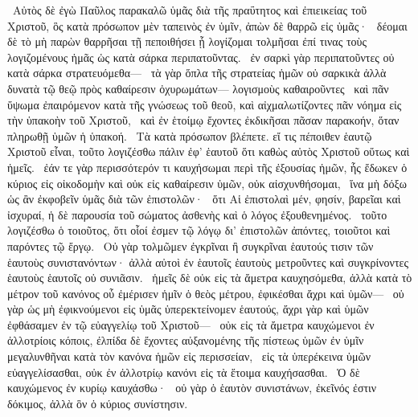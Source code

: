 ~Αὐτὸς δὲ ἐγὼ Παῦλος παρακαλῶ ὑμᾶς διὰ τῆς πραΰτητος καὶ ἐπιεικείας τοῦ Χριστοῦ, ὃς κατὰ πρόσωπον μὲν ταπεινὸς ἐν ὑμῖν, ἀπὼν δὲ θαρρῶ εἰς ὑμᾶς·
~δέομαι δὲ τὸ μὴ παρὼν θαρρῆσαι τῇ πεποιθήσει ᾗ λογίζομαι τολμῆσαι ἐπί τινας τοὺς λογιζομένους ἡμᾶς ὡς κατὰ σάρκα περιπατοῦντας.
~ἐν σαρκὶ γὰρ περιπατοῦντες οὐ κατὰ σάρκα στρατευόμεθα—
~τὰ γὰρ ὅπλα τῆς στρατείας ἡμῶν οὐ σαρκικὰ ἀλλὰ δυνατὰ τῷ θεῷ πρὸς καθαίρεσιν ὀχυρωμάτων— λογισμοὺς καθαιροῦντες
~καὶ πᾶν ὕψωμα ἐπαιρόμενον κατὰ τῆς γνώσεως τοῦ θεοῦ, καὶ αἰχμαλωτίζοντες πᾶν νόημα εἰς τὴν ὑπακοὴν τοῦ Χριστοῦ,
~καὶ ἐν ἑτοίμῳ ἔχοντες ἐκδικῆσαι πᾶσαν παρακοήν, ὅταν πληρωθῇ ὑμῶν ἡ ὑπακοή.
~Τὰ κατὰ πρόσωπον βλέπετε. εἴ τις πέποιθεν ἑαυτῷ Χριστοῦ εἶναι, τοῦτο λογιζέσθω πάλιν ἐφ’ ἑαυτοῦ ὅτι καθὼς αὐτὸς Χριστοῦ οὕτως καὶ ἡμεῖς.
~ἐάν τε γὰρ περισσότερόν τι καυχήσωμαι περὶ τῆς ἐξουσίας ἡμῶν, ἧς ἔδωκεν ὁ κύριος εἰς οἰκοδομὴν καὶ οὐκ εἰς καθαίρεσιν ὑμῶν, οὐκ αἰσχυνθήσομαι,
~ἵνα μὴ δόξω ὡς ἂν ἐκφοβεῖν ὑμᾶς διὰ τῶν ἐπιστολῶν·
~ὅτι Αἱ ἐπιστολαὶ μέν, φησίν, βαρεῖαι καὶ ἰσχυραί, ἡ δὲ παρουσία τοῦ σώματος ἀσθενὴς καὶ ὁ λόγος ἐξουθενημένος.
~τοῦτο λογιζέσθω ὁ τοιοῦτος, ὅτι οἷοί ἐσμεν τῷ λόγῳ δι’ ἐπιστολῶν ἀπόντες, τοιοῦτοι καὶ παρόντες τῷ ἔργῳ.
~Οὐ γὰρ τολμῶμεν ἐγκρῖναι ἢ συγκρῖναι ἑαυτούς τισιν τῶν ἑαυτοὺς συνιστανόντων· ἀλλὰ αὐτοὶ ἐν ἑαυτοῖς ἑαυτοὺς μετροῦντες καὶ συγκρίνοντες ἑαυτοὺς ἑαυτοῖς οὐ συνιᾶσιν.
~ἡμεῖς δὲ οὐκ εἰς τὰ ἄμετρα καυχησόμεθα, ἀλλὰ κατὰ τὸ μέτρον τοῦ κανόνος οὗ ἐμέρισεν ἡμῖν ὁ θεὸς μέτρου, ἐφικέσθαι ἄχρι καὶ ὑμῶν—
~οὐ γὰρ ὡς μὴ ἐφικνούμενοι εἰς ὑμᾶς ὑπερεκτείνομεν ἑαυτούς, ἄχρι γὰρ καὶ ὑμῶν ἐφθάσαμεν ἐν τῷ εὐαγγελίῳ τοῦ Χριστοῦ—
~οὐκ εἰς τὰ ἄμετρα καυχώμενοι ἐν ἀλλοτρίοις κόποις, ἐλπίδα δὲ ἔχοντες αὐξανομένης τῆς πίστεως ὑμῶν ἐν ὑμῖν μεγαλυνθῆναι κατὰ τὸν κανόνα ἡμῶν εἰς περισσείαν,
~εἰς τὰ ὑπερέκεινα ὑμῶν εὐαγγελίσασθαι, οὐκ ἐν ἀλλοτρίῳ κανόνι εἰς τὰ ἕτοιμα καυχήσασθαι.
~Ὁ δὲ καυχώμενος ἐν κυρίῳ καυχάσθω·
~οὐ γὰρ ὁ ἑαυτὸν συνιστάνων, ἐκεῖνός ἐστιν δόκιμος, ἀλλὰ ὃν ὁ κύριος συνίστησιν.

